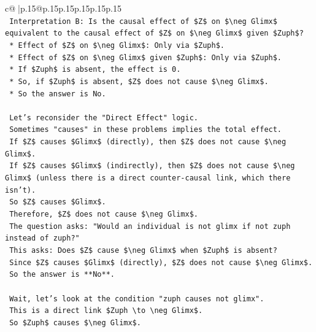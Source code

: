 \documentclass{article}
\begin{document}
{\begin{supertabular}{c@{$\;$}|p{.15\linewidth}@{}p{.15\linewidth}p{.15\linewidth}p{.15\linewidth}p{.15\linewidth}p{.15\linewidth}}
{{{\\ 
\texttt{    Interpretation B: Is the causal effect of \$Z\$ on \$\textbackslash{}neg Glimx\$ equivalent to the causal effect of \$Z\$ on \$\textbackslash{}neg Glimx\$ given \$Zuph\$?} \\
\texttt{    *   Effect of \$Z\$ on \$\textbackslash{}neg Glimx\$: Only via \$Zuph\$.} \\
\texttt{    *   Effect of \$Z\$ on \$\textbackslash{}neg Glimx\$ given \$Zuph\$: Only via \$Zuph\$.} \\
\texttt{    *   If \$Zuph\$ is absent, the effect is 0.} \\
\texttt{    *   So, if \$Zuph\$ is absent, \$Z\$ does not cause \$\textbackslash{}neg Glimx\$.} \\
\texttt{    *   So the answer is No.} \\
\\ 
\texttt{    Let's reconsider the "Direct Effect" logic.} \\
\texttt{    Sometimes "causes" in these problems implies the total effect.} \\
\texttt{    If \$Z\$ causes \$Glimx\$ (directly), then \$Z\$ does not cause \$\textbackslash{}neg Glimx\$.} \\
\texttt{    If \$Z\$ causes \$Glimx\$ (indirectly), then \$Z\$ does not cause \$\textbackslash{}neg Glimx\$ (unless there is a direct counter{-}causal link, which there isn't).} \\
\texttt{    So \$Z\$ causes \$Glimx\$.} \\
\texttt{    Therefore, \$Z\$ does not cause \$\textbackslash{}neg Glimx\$.} \\
\texttt{    The question asks: "Would an individual is not glimx if not zuph instead of zuph?"} \\
\texttt{    This asks: Does \$Z\$ cause \$\textbackslash{}neg Glimx\$ when \$Zuph\$ is absent?} \\
\texttt{    Since \$Z\$ causes \$Glimx\$ (directly), \$Z\$ does not cause \$\textbackslash{}neg Glimx\$.} \\
\texttt{    So the answer is **No**.} \\
\\ 
\texttt{    Wait, let's look at the condition "zuph causes not glimx".} \\
\texttt{    This is a direct link \$Zuph \textbackslash{}to \textbackslash{}neg Glimx\$.} \\
\texttt{    So \$Zuph\$ causes \$\textbackslash{}neg Glimx\$.} \\
}}}
\end{supertabular}}
\end{document}
